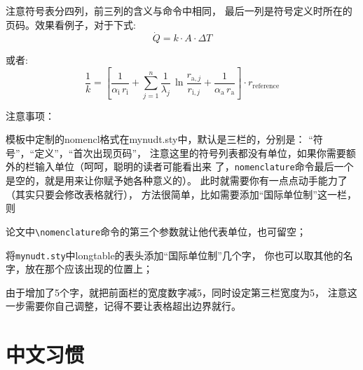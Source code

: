 注意符号表分四列，前三列的含义与命令中相同，
最后一列是符号定义时所在的页码。效果看例子，对于下式:
\begin{equation}\label{eq:heatflux}
   \dot{Q} = k \cdot A \cdot \Delta T
\end{equation}%
%
%
%
%
%
%
%

或者:
\begin{equation}\label{eq:ohtc}
    \frac{1}{k} = \left[\frac{1}{\alpha _{\mathrm{i}}\,r_{\mathrm{i}}} +
    \sum^n_{j=1}\frac{1}{\lambda _j}\,
    \ln \frac{r_{\mathrm{a},j}}{r_{\mathrm{i},j}} +
    \frac{1}{\alpha _{\mathrm{a}}\,
    r_{\mathrm{a}}}\right] \cdot r_{\mathrm{reference}}
\end{equation}%
%
%
%
%
%
%

{\hei 注意事项：}{\kai 模板中定制的nomencl格式在mynudt.sty中，默认是三栏的，分别是：
``符号''，``定义''，``首次出现页码''，
注意这里的符号列表都没有单位，如果你需要额外的栏输入单位（呵呵，聪明的读者可能看出来
了，\verb|nomenclature|命令最后一个是空的，就是用来让你赋予她各种意义的）。
此时就需要你有一点点动手能力了（其实只要会修改表格就行），
方法很简单，比如需要添加``国际单位制''这一栏，则
\begin{compactenum}
\item 论文中\verb|\nomenclature|命令的第三个参数就让他代表单位，也可留空；
\item 将\verb|mynudt.sty|中longtable的表头添加``国际单位制''几个字，
你也可以取其他的名字，放在那个{\kai 应该出现的}位置上；
\item 由于增加了5个字，就把前面栏的宽度数字减5，同时设定第三栏宽度为5，
注意这一步需要你自己调整，记得不要让表格超出边界就行。
\end{compactenum}
}

\section{中文习惯}
\label{sec:chinese}

